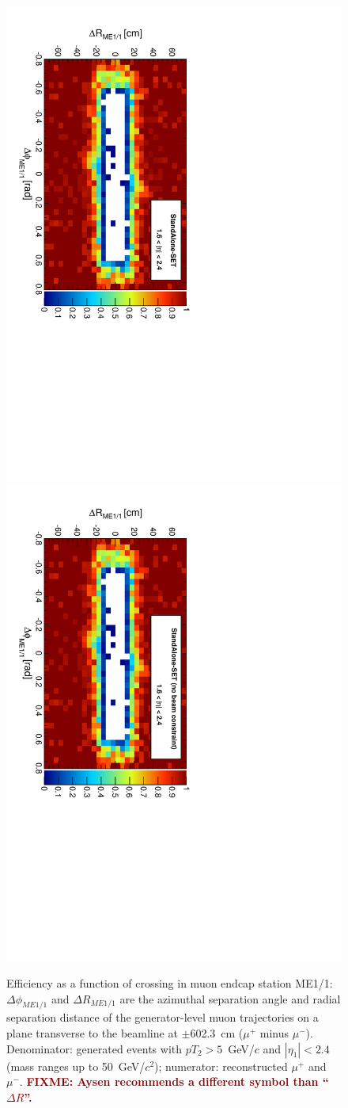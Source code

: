 \documentclass[12pt]{article}
\newcommand{\fixme}[1]{\textcolor{darkred}{\bf FIXME: #1}}
\begin{document}
\begin{figure}[p]
\includegraphics[height=0.5\linewidth, angle=90]{fig/acceptance7_plot/me11_StandAloneUpdatedSET.pdf}
\includegraphics[height=0.5\linewidth, angle=90]{fig/acceptance7_plot/me11_StandAloneSET.pdf}

\caption{Efficiency as a function of crossing in muon endcap station
  ME1/1: $\Delta\phi_{ME1/1}$ and $\Delta R_{ME1/1}$ are the azimuthal
  separation angle and radial separation distance of the
  generator-level muon trajectories on a plane transverse to the
  beamline at $\pm$602.3~cm ($\mu^+$ minus $\mu^-$).  Denominator:
  generated events with $pT_2 > 5$~GeV/$c$ and $|\eta_1| < 2.4$ (mass
  ranges up to 50~GeV/$c^2$); numerator: reconstructed $\mu^+$ and
  $\mu^-$. \fixme{Aysen recommends a different symbol than ``$\Delta
    R$''.} \label{fig:me11}}
\end{figure}
\end{document}
